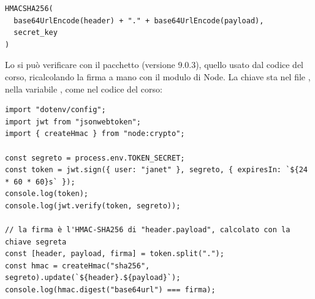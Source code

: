 \begin{affianco}[0.62][c]
\codicepiccolo
\begin{lstlisting}[style=js]
HMACSHA256(
  base64UrlEncode(header) + "." + base64UrlEncode(payload),
  secret_key
)
\end{lstlisting}
\risultato
\begin{immagine}
\end{immagine}
\end{affianco}

Lo si può verificare con il pacchetto  (versione 9.0.3),
quello usato dal codice del corso, ricalcolando la firma a mano con il modulo
 di Node. La chiave sta nel file , nella variabile
, come nel codice del corso:

\begin{lstlisting}[style=js, name=token.js]
import "dotenv/config";
import jwt from "jsonwebtoken";
import { createHmac } from "node:crypto";

const segreto = process.env.TOKEN_SECRET;
const token = jwt.sign({ user: "janet" }, segreto, { expiresIn: `${24 * 60 * 60}s` });
console.log(token);
console.log(jwt.verify(token, segreto));

// la firma è l'HMAC-SHA256 di "header.payload", calcolato con la chiave segreta
const [header, payload, firma] = token.split(".");
const hmac = createHmac("sha256", segreto).update(`${header}.${payload}`);
console.log(hmac.digest("base64url") === firma);
\end{lstlisting}

